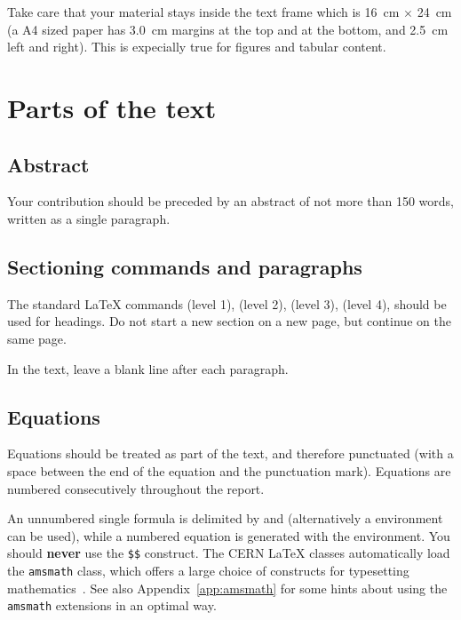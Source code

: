 \documentclass{cernrep}
\begin{document}
Take care that your material stays inside the text frame which is
16~cm $\times$ 24~cm (\ie a A4 sized paper has 3.0~cm margins at the
top and at the bottom, and 2.5~cm left and right). This is expecially
true for figures and tabular content.

\section{Parts of the text}

\subsection{Abstract}

Your contribution should be preceded by an abstract of not more than
150 words, written as a single paragraph.


\subsection{Sectioning commands and paragraphs}
\label{sec:sections}

The standard \LaTeX{} commands  (level 1),
 (level 2),  (level 3),
 (level 4), should be used for headings.  Do not
start a new section on a new page, but continue on the same page.

In the text, leave a blank line after each paragraph.

\subsection{Equations}
\label{sec:equations}

Equations should be treated as part of the text, and therefore
punctuated (with a space between the end of the equation and the
punctuation mark).  Equations are numbered consecutively throughout
the report. 

An unnumbered single formula is delimited by \Lcs{[} and \Lcs{]}
(alternatively a  environment can be used), while a
numbered equation is generated with the  environment.
You should \textbf{never} use the \texttt{\$\$} construct.  The CERN
\LaTeX{} classes automatically load the \texttt{amsmath} class, which
offers a large choice of constructs for typesetting
mathematics~\cite{bib:voss2005}. See also Appendix~\ref{app:amsmath}
for some hints about using the \texttt{amsmath} extensions in an
optimal way.
\end{document}
